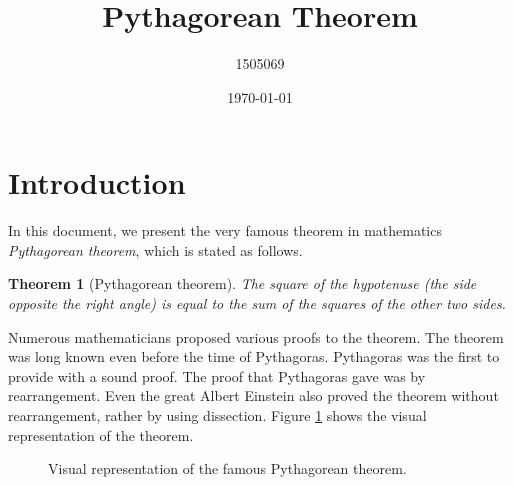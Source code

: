 \documentclass{article}
\title{Pythagorean Theorem}
\author{1505069}
\date{\today}
\newtheorem{theorem}{Theorem}[section]
\begin{document}
\maketitle
\section{Introduction}
In this document, we present the very famous theorem in mathematics
\textit{Pythagorean theorem}, which is stated as follows.
\begin{theorem}[Pythagorean theorem]
The square of the hypotenuse (the side opposite the right angle) is equal to the sum of the squares of the other two sides.
\end{theorem}

Numerous mathematicians proposed various proofs to the theorem. The
theorem was long known even before the time of Pythagoras. Pythagoras was
the first to provide with a sound proof. The proof that Pythagoras gave was by rearrangement. Even the great Albert Einstein also proved the theorem without rearrangement, rather by using dissection. Figure \ref{fig:representation1} shows the visual representation of the theorem.
\begin{figure}[h]
    \centering
	\caption{Visual representation of the famous Pythagorean theorem.}
    \label{fig:representation1}
\end{figure}
\end{document}
